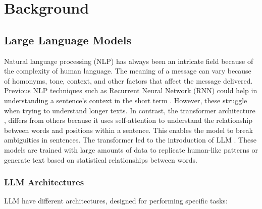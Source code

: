 

\section{Background}

\subsection{Large Language Models}
Natural language processing (NLP) has always been an intricate field because of the complexity of human language. The meaning of a message can vary because of homonyms, tone, context, and other factors that affect the message delivered. 
Previous NLP techniques such as Recurrent Neural Network (RNN) could help in understanding a sentence's context in the short term \cite{Sherstinsky_2020}. However, these struggle when trying to understand longer texts. In contrast, the  transformer architecture \cite{vaswani2023attentionneed}, differs from others because it uses self-attention to understand the relationship between words and positions within a sentence. This enables the model to break ambiguities in sentences. The transformer led to the introduction of LLM \cite{naveed2024comprehensiveoverviewlargelanguage}. These models are trained with large amounts of data to replicate human-like patterns or generate text based on statistical relationships between words.

%

\subsubsection{LLM Architectures}
LLM have different architectures, designed for performing specific tasks:

